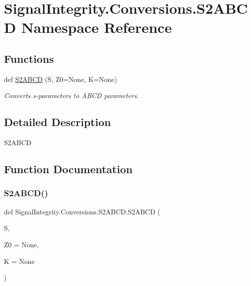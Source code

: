 \hypertarget{namespaceSignalIntegrity_1_1Conversions_1_1S2ABCD}{}\section{Signal\+Integrity.\+Conversions.\+S2\+A\+B\+CD Namespace Reference}
\label{namespaceSignalIntegrity_1_1Conversions_1_1S2ABCD}
\subsection*{Functions}
\begin{DoxyCompactItemize}
\item 
def \hyperlink{namespaceSignalIntegrity_1_1Conversions_1_1S2ABCD_abca45bad6df5177eb84f92be692849f1}{S2\+A\+B\+CD} (S, Z0=None, K=None)
\begin{DoxyCompactList}\small\item\em Converts s-\/parameters to A\+B\+CD parameters. \end{DoxyCompactList}\end{DoxyCompactItemize}


\subsection{Detailed Description}
\begin{DoxyVerb}S2ABCD\end{DoxyVerb}
 

\subsection{Function Documentation}
\mbox{\label{namespaceSignalIntegrity_1_1Conversions_1_1S2ABCD_abca45bad6df5177eb84f92be692849f1}} 
\subsubsection{\texorpdfstring{S2\+A\+B\+C\+D()}{S2ABCD()}}
{\footnotesize\ttfamily def Signal\+Integrity.\+Conversions.\+S2\+A\+B\+C\+D.\+S2\+A\+B\+CD (\begin{DoxyParamCaption}\item[{}]{S,  }\item[{}]{Z0 = {\ttfamily None},  }\item[{}]{K = {\ttfamily None} }\end{DoxyParamCaption})}



